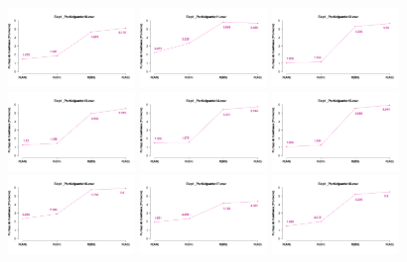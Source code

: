 \documentclass[a4paper ]{article}
\begin{document}
\begin{figure}[th]
\includegraphics[width=0.3\textwidth]{Figures/MirrorRating_Exp1_P10} \includegraphics[width=0.3\textwidth]{Figures/MirrorRating_Exp1_P11} \includegraphics[width=0.3\textwidth]{Figures/MirrorRating_Exp1_P12}
\includegraphics[width=0.3\textwidth]{Figures/MirrorRating_Exp1_P13} \includegraphics[width=0.3\textwidth]{Figures/MirrorRating_Exp1_P14} \includegraphics[width=0.3\textwidth]{Figures/MirrorRating_Exp1_P15}
\includegraphics[width=0.3\textwidth]{Figures/MirrorRating_Exp1_P16} \includegraphics[width=0.3\textwidth]{Figures/MirrorRating_Exp1_P17} \includegraphics[width=0.3\textwidth]{Figures/MirrorRating_Exp1_P18}

\end{figure}
\end{document}
